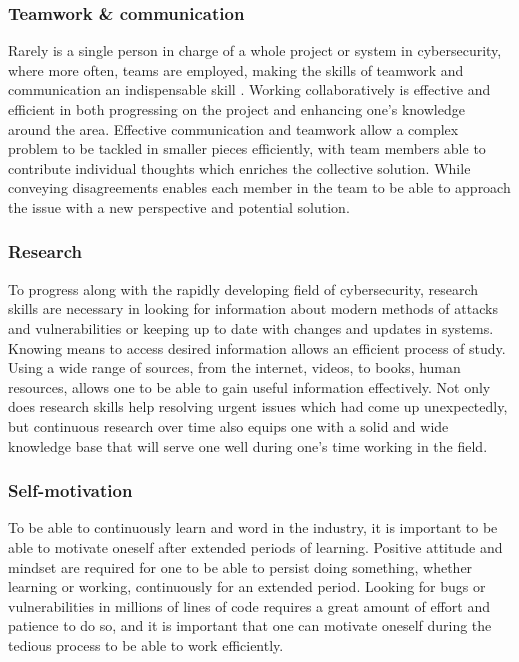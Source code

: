 \documentclass[a4paper, 11pt]{report}
\begin{document}
\subsubsection{Teamwork \& communication}
Rarely is a single person in charge of a whole project or system in cybersecurity, where more often, teams are employed, making the skills of teamwork and communication an indispensable skill \cite{liu2017theory}. Working collaboratively is effective and efficient in both progressing on the project and enhancing one’s knowledge around the area. Effective communication and teamwork allow a complex problem to be tackled in smaller pieces efficiently, with team members able to contribute individual thoughts which enriches the collective solution. While conveying disagreements enables each member in the team to be able to approach the issue with a new perspective and potential solution.  

\subsubsection{Research}
To progress along with the rapidly developing field of cybersecurity, research skills are necessary in looking for information about modern methods of attacks and vulnerabilities or keeping up to date with changes and updates in systems. Knowing means to access desired information allows an efficient process of study. Using a wide range of sources, from the internet, videos, to books, human resources, allows one to be able to gain useful information effectively. Not only does research skills help resolving urgent issues which had come up unexpectedly, but continuous research over time also equips one with a solid and wide knowledge base that will serve one well during one’s time working in the field.  
\subsubsection{Self-motivation}
To be able to continuously learn and word in the industry, it is important to be able to motivate oneself after extended periods of learning. Positive attitude and mindset are required for one to be able to persist doing something, whether learning or working, continuously for an extended period. Looking for bugs or vulnerabilities in millions of lines of code requires a great amount of effort and patience to do so, and it is important that one can motivate oneself during the tedious process to be able to work efficiently.  
\end{document}
